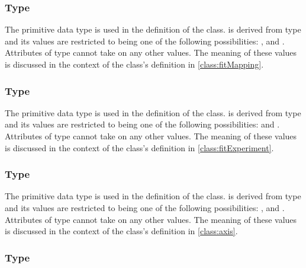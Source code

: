 \subsubsection[\element{MappingType}]{Type }
\label{type:mappingType}

The  primitive data type is used in the definition of the \FitMapping class.   is derived from type  and its values are restricted to being one of the following possibilities: ,  and .  Attributes of type  cannot take on any other values.  The meaning of these values is discussed in the context of the \FitMapping class's definition in \ref{class:fitMapping}.


\subsubsection[\element{ExperimentType}]{Type }
\label{type:experimentType}

The  primitive data type is used in the definition of the \FitExperiment class.   is derived from type  and its values are restricted to being one of the following possibilities:  and .  Attributes of type  cannot take on any other values.  The meaning of these values is discussed in the context of the \FitExperiment class's definition in \ref{class:fitExperiment}.


\subsubsection[\element{AxisType}]{Type }
\label{type:axisType}

The  primitive data type is used in the definition of the \Axis class.   is derived from type  and its values are restricted to being one of the following possibilities: , and .  Attributes of type  cannot take on any other values.  The meaning of these values is discussed in the context of the \Axis class's definition in \ref{class:axis}.

\subsubsection[\element{ScaleType}]{Type }
\label{type:scaleType}

